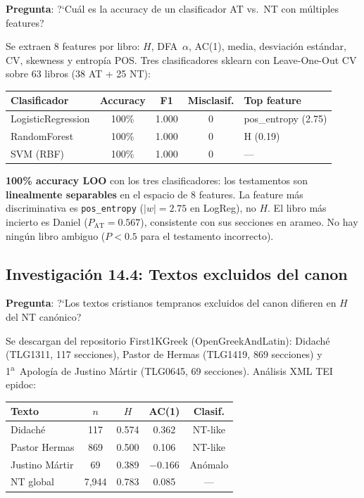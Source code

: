 \documentclass[12pt,a4paper]{article}
\begin{document}
\textbf{Pregunta}: ?`Cu\'al es la accuracy de un clasificador AT vs.\ NT con
m\'ultiples features?

Se extraen 8 features por libro: $H$, DFA~$\alpha$, AC(1), media, desviaci\'on
est\'andar, CV, skewness y entrop\'ia POS. Tres clasificadores sklearn con
Leave-One-Out CV sobre 63 libros (38 AT + 25 NT):

\begin{center}
\begin{tabular}{lcccl}
\toprule
\textbf{Clasificador} & \textbf{Accuracy} & \textbf{F1} & \textbf{Misclasif.} & \textbf{Top feature} \\
\midrule
LogisticRegression & 100\% & 1.000 & 0 & pos\_entropy (2.75) \\
RandomForest       & 100\% & 1.000 & 0 & H (0.19) \\
SVM (RBF)          & 100\% & 1.000 & 0 & --- \\
\bottomrule
\end{tabular}
\end{center}

\noindent
\textbf{100\% accuracy LOO} con los tres clasificadores: los testamentos son
\textbf{linealmente separables} en el espacio de 8 features. La feature m\'as
discriminativa es \texttt{pos\_entropy} ($|w| = 2.75$ en LogReg), no $H$.
El libro m\'as incierto es Daniel ($P_{\text{AT}} = 0.567$), consistente con
sus secciones en arameo. No hay ning\'un libro ambiguo ($P < 0.5$ para el
testamento incorrecto).

\subsection{Investigaci\'on 14.4: Textos excluidos del canon}

\textbf{Pregunta}: ?`Los textos cristianos tempranos excluidos del canon difieren
en $H$ del NT can\'onico?

Se descargan del repositorio First1KGreek (OpenGreekAndLatin): Didach\'e
(TLG1311, 117 secciones), Pastor de Hermas (TLG1419, 869 secciones) y
1\textsuperscript{a}~Apolog\'ia de Justino M\'artir (TLG0645, 69 secciones).
An\'alisis XML TEI epidoc:

\begin{center}
\begin{tabular}{lcccc}
\toprule
\textbf{Texto} & $n$ & $H$ & AC(1) & \textbf{Clasif.} \\
\midrule
Didach\'e      & 117 & 0.574 & 0.362 & NT-like \\
Pastor Hermas  & 869 & 0.500 & 0.106 & NT-like \\
Justino M\'artir& 69 & 0.389 & $-0.166$ & An\'omalo \\
\midrule
NT global      & 7,944 & 0.783 & 0.085 & --- \\
\bottomrule
\end{tabular}
\end{center}
\end{document}
